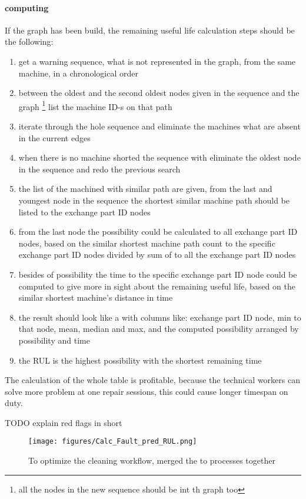 			\paragraph{computing}
			If the graph has been build, the remaining useful life calculation steps should be the following:
			\begin{enumerate}
				\item{get a warning sequence, what is not represented in the graph, from the same machine, in a chronological order}
				\item{between the oldest and the second oldest nodes given in the sequence and the graph \footnote{all the nodes in the new sequence should be int th graph too} list the machine ID-s on that path}
				\item{iterate through the hole sequence and eliminate the machines what are absent in the current edges}
				\item{when there is no machine shorted the sequence with eliminate the oldest node in the sequence and redo the previous search}
				\item{the list of the machined with similar path are given, from the last and youngest node in the sequence the shortest similar machine path should be listed to the exchange part ID nodes}
				\item{from the last node the possibility could be calculated to all exchange part ID nodes, based on the similar shortest machine path count to the specific exchange part ID nodes divided by sum of to all the exchange part ID nodes}
				\item{besides of possibility the time to the specific exchange part ID node could be computed to give more in sight about the remaining useful life, based on the similar shortest machine's distance in time}
				\item{the result should look like a with columns like: exchange part ID node, min to that node, mean, median and max, and the computed possibility arranged by possibility and time} 
		 		\item{the RUL is the highest possibility with the shortest remaining time}
		 	\end{enumerate}
			
		The calculation of the whole table is profitable, because the technical workers can solve more problem at one repair sessions, this could cause longer timespan on duty.

		TODO explain red flags in short
		\begin{figure}[!ht]
		\centering
		\texttt{[image: figures/Calc\_Fault\_pred\_RUL.png]}
		\caption{To optimize the cleaning workflow, merged the to processes together} 
		\end{figure}
